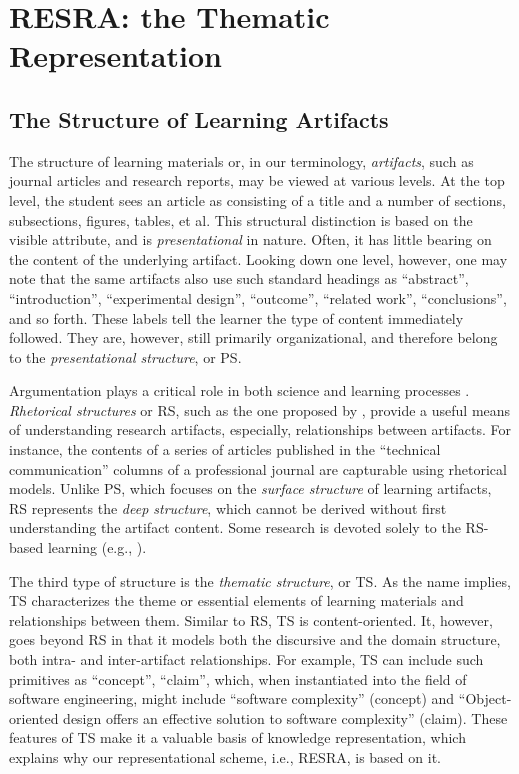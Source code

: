 \section{RESRA: the Thematic Representation}
\label{sec:resra}

\subsection{The Structure of Learning Artifacts}

The structure of learning materials or, in our terminology, {\it
artifacts\/}, such as journal articles and research reports, may be viewed
at various levels. At the top level, the student sees an article as
consisting of a title and a number of sections, subsections, figures,
tables, et al. This structural distinction is based on the visible
attribute, and is {\it presentational\/} in nature.  Often, it has little
bearing on the content of the underlying artifact.  Looking down one level,
however, one may note that the same artifacts also use such standard
headings as ``abstract'', ``introduction'', ``experimental design'',
``outcome'', ``related work'', ``conclusions'', and so forth. These labels
tell the learner the type of content immediately followed. They are,
however, still primarily organizational, and therefore belong to the {\it
presentational structure\/}, or PS.

Argumentation plays a critical role in both science and learning processes
\cite{Cross90}. {\it Rhetorical structures\/} or RS, such as the one
proposed by \cite{Toulmin84}, provide a useful means of understanding
research artifacts, especially, relationships between artifacts. For
instance, the contents of a series of articles published in the ``technical
communication'' columns of a professional journal are capturable using
rhetorical models. Unlike PS, which focuses on the {\it surface
structure\/} of learning artifacts, RS represents the {\it deep
structure\/}, which cannot be derived without first understanding the
artifact content. Some research is devoted solely to the RS-based learning
(e.g., \cite{Cavalli-Sforza92}).

The third type of structure is the {\it thematic structure\/}, or TS. As
the name implies, TS characterizes the theme or essential elements of
learning materials and relationships between them. Similar to RS, TS is
content-oriented. It, however, goes beyond RS in that it models both the
discursive and the domain structure, both intra- and inter-artifact
relationships.  For example, TS can include such primitives as ``concept'',
``claim'', which, when instantiated into the field of software engineering,
might include ``software complexity'' (concept) and ``Object-oriented
design offers an effective solution to software complexity'' (claim). These
features of TS make it a valuable basis of knowledge representation, which
explains why our representational scheme, i.e., RESRA, is based on it.


